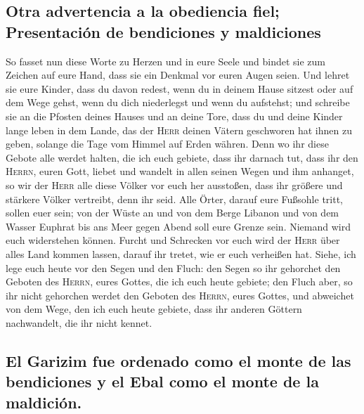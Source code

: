 \hypertarget{otra-advertencia-a-la-obediencia-fiel-presentaciuxf3n-de-bendiciones-y-maldiciones}{%
\subsection{Otra advertencia a la obediencia fiel; Presentación de
bendiciones y
maldiciones}\label{otra-advertencia-a-la-obediencia-fiel-presentaciuxf3n-de-bendiciones-y-maldiciones}}

 So fasset nun diese Worte zu Herzen und in eure Seele
und bindet sie zum Zeichen auf eure Hand, dass sie ein Denkmal vor euren
Augen seien.  Und lehret sie eure Kinder, dass du davon
redest, wenn du in deinem Hause sitzest oder auf dem Wege gehst, wenn du
dich niederlegst und wenn du aufstehst;  und schreibe sie
an die Pfosten deines Hauses und an deine Tore,  dass du
und deine Kinder lange leben in dem Lande, das der \textsc{Herr} deinen
Vätern geschworen hat ihnen zu geben, solange die Tage vom Himmel auf
Erden währen.  Denn wo ihr diese Gebote alle werdet
halten, die ich euch gebiete, dass ihr darnach tut, dass ihr den
\textsc{Herrn}, euren Gott, liebet und wandelt in allen seinen Wegen und
ihm anhanget,  so wir der \textsc{Herr} alle diese Völker
vor euch her ausstoßen, dass ihr größere und stärkere Völker vertreibt,
denn ihr seid.  Alle Örter, darauf eure Fußsohle tritt,
sollen euer sein; von der Wüste an und von dem Berge Libanon und von dem
Wasser Euphrat bis ans Meer gegen Abend soll eure Grenze sein.
 Niemand wird euch widerstehen können. Furcht und
Schrecken vor euch wird der \textsc{Herr} über alles Land kommen lassen,
darauf ihr tretet, wie er euch verheißen hat.  Siehe, ich
lege euch heute vor den Segen und den Fluch:  den Segen
so ihr gehorchet den Geboten des \textsc{Herrn}, eures Gottes, die ich
euch heute gebiete;  den Fluch aber, so ihr nicht
gehorchen werdet den Geboten des \textsc{Herrn}, eures Gottes, und
abweichet von dem Wege, den ich euch heute gebiete, dass ihr anderen
Göttern nachwandelt, die ihr nicht kennet.

\hypertarget{el-garizim-fue-ordenado-como-el-monte-de-las-bendiciones-y-el-ebal-como-el-monte-de-la-maldiciuxf3n.}{%
\subsection{El Garizim fue ordenado como el monte de las bendiciones y
el Ebal como el monte de la
maldición.}\label{el-garizim-fue-ordenado-como-el-monte-de-las-bendiciones-y-el-ebal-como-el-monte-de-la-maldiciuxf3n.}}

